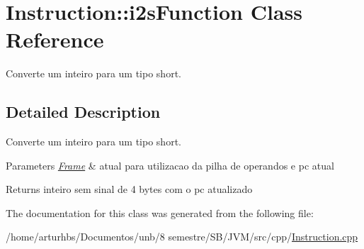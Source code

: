 \hypertarget{classInstruction_1_1i2sFunction}{}\section{Instruction\+:\+:i2s\+Function Class Reference}
\label{classInstruction_1_1i2sFunction}


Converte um inteiro para um tipo short.  




\subsection{Detailed Description}
Converte um inteiro para um tipo short. 


\begin{DoxyParams}{Parameters}
{\em \hyperlink{classFrame}{Frame}} & atual para utilizacao da pilha de operandos e pc atual \\
\hline
\end{DoxyParams}
\begin{DoxyReturn}{Returns}
inteiro sem sinal de 4 bytes com o pc atualizado 
\end{DoxyReturn}


The documentation for this class was generated from the following file\+:\begin{DoxyCompactItemize}
\item 
/home/arturhbs/\+Documentos/unb/8 semestre/\+S\+B/\+J\+V\+M/src/cpp/\hyperlink{Instruction_8cpp}{Instruction.\+cpp}\end{DoxyCompactItemize}
